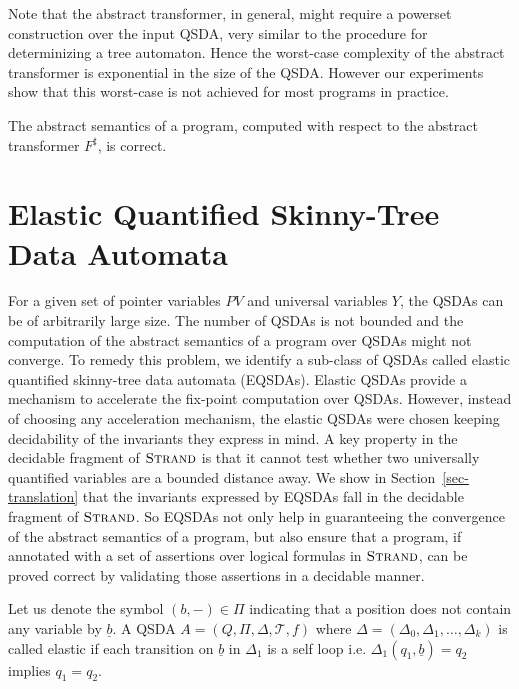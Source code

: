 \documentclass{llncs}
\newcommand{\Strand}{\textsc{Strand}\xspace}
\newcommand{\yblank}{-}
\newcommand{\blank}{\underline{b}}
\newcommand{\PV}{\mathit{PV}}
\newcommand{\EQSDA}{\mbox{\sc EQSDA}}
\begin{document}
Note that the abstract transformer, in general, might require a powerset construction over the input QSDA, very similar to the procedure for determinizing a tree automaton. Hence the worst-case complexity of the abstract transformer is exponential in the size of the QSDA. However our experiments show that this worst-case is not achieved for most programs in practice.
\begin{theorem}
The abstract semantics of a program, computed with respect to the abstract transformer $F^\sharp$, is correct.
\end{theorem}



\section{Elastic Quantified Skinny-Tree Data Automata}
For a given set of pointer variables $\PV$ and universal variables $Y$, the QSDAs can be of arbitrarily large size. The number of QSDAs is not bounded and the computation of the abstract semantics of a program over QSDAs might not converge.
To remedy this problem, we identify a sub-class of QSDAs called elastic quantified  skinny-tree data automata (\EQSDA s).
Elastic QSDAs provide a mechanism to accelerate the fix-point computation over QSDAs. However, instead of choosing any acceleration mechanism, the elastic QSDAs were chosen keeping decidability of the invariants they express in mind.  A key property in the decidable fragment of $\Strand$ is that it cannot test whether two universally quantified variables are a bounded distance away.
We show in Section~\ref{sec-translation} that the invariants expressed by \EQSDA s fall in the decidable fragment of $\Strand$.
So \EQSDA s not only help in guaranteeing the convergence of the abstract semantics of a program, but also ensure that a program, if annotated with a set of assertions over logical formulas in $\Strand$, can be proved correct by validating those assertions in a decidable manner.

Let us denote the symbol $(b, \yblank) \in \Pi$ indicating that a position does not contain any variable by $\blank$.
A QSDA $A = (Q, \Pi, \Delta, \mathcal{T}, f)$ where $\Delta = (\Delta_0, \Delta_1,  \ldots, \Delta_k)$ is called elastic if each transition on $\blank$ in $\Delta_1$ is a self loop i.e. $\Delta_1(q_1, \blank) = q_2$ implies $q_1= q_2$.
\end{document}
